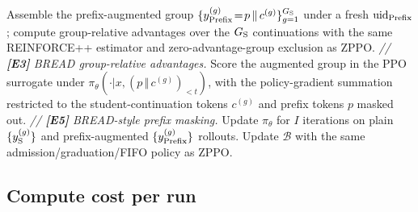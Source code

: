 \begin{algorithm*}[!htbp]
{{        Assemble the prefix-augmented group $\{y_{\rm Prefix}^{(g)}\!=\!p\,\Vert\,c^{(g)}\}_{g=1}^{G_{\rm S}}$ under a fresh $\mathrm{uid}_{\rm Prefix}$; compute group-relative advantages over the $G_{\rm S}$ continuations with the same REINFORCE++ estimator and zero-advantage-group exclusion as ZPPO. \textit{// \textbf{[E3]} BREAD group-relative advantages.}\;
        Score the augmented group in the PPO surrogate under $\pi_\theta(\cdot|x, (p\,\Vert\,c^{(g)})_{<t})$, with the policy-gradient summation restricted to the student-continuation tokens $c^{(g)}$ and prefix tokens $p$ masked out. \textit{// \textbf{[E5]} BREAD-style prefix masking.}\;
    }
}
Update $\pi_\theta$ for $I$ iterations on plain $\{y_{\rm S}^{(g)}\}$ and prefix-augmented $\{y_{\rm Prefix}^{(g)}\}$ rollouts.\;
Update $\mathcal{B}$ with the same admission/graduation/FIFO policy as ZPPO.\;
\caption{Prefix training step. Steps are tagged with the BREAD~\citep{zhang2025bread} (E1--E5) and StepHint~\citep{zhang2025stephint} (F1--F3) component each inherits, including BREAD-style teacher-prefix masking from the policy loss (E5). EAS is omitted and the prefix fraction is fixed at $\alpha\!=\!0.4$. Teacher rollouts are drawn online on $X_{\rm aug}$ only, and each prefix-augmented question contributes a $G_{\rm S}$-sized group sharing the same prefix, scored with group-relative advantages identical to ZPPO/BCQ/NCQ.}
\label{alg:prefix}
\end{algorithm*}

\subsection{Compute cost per run}
\label{sec:appendix:hyperparameters:compute}

